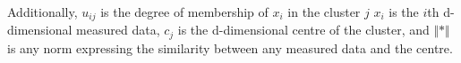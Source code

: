 
Additionally, $u_{ij}$ is the degree of membership of $x_i$ in the cluster $j$ $x_i$ is the $i$th d-dimensional measured data, $c_j$ is the d-dimensional centre of the cluster, and $\Vert * \Vert$ is any norm expressing the similarity between any measured data and the centre.

